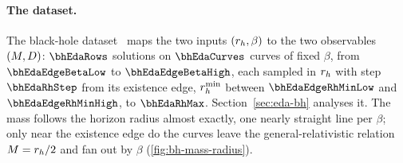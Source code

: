 \paragraph{The dataset.}
The black-hole dataset~\citep{Doneva2017_BH} maps the two inputs $(r_h, \beta)$ to the two observables $(M, D)$: $\bhEdaRows$ solutions on $\bhEdaCurves$ curves of fixed $\beta$, from $\bhEdaEdgeBetaLow$ to $\bhEdaEdgeBetaHigh$, each sampled in $r_h$ with step $\bhEdaRhStep$ from its existence edge, $r_h^{\min}$ between $\bhEdaEdgeRhMinLow$ and $\bhEdaEdgeRhMinHigh$, to $\bhEdaRhMax$. Section~\ref{sec:eda-bh} analyses it. The mass follows the horizon radius almost exactly, one nearly straight line per $\beta$; only near the existence edge do the curves leave the general-relativistic relation $M = r_h/2$ and fan out by $\beta$ (\cref{fig:bh-mass-radius}).

